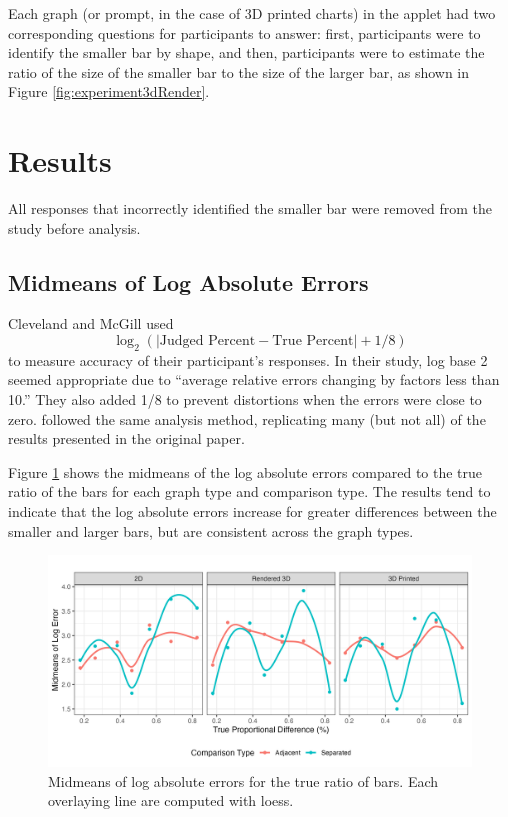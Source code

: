 \documentclass[letterpaper,inpress,dvipsnames]{jdsart}
\begin{document}
Each graph (or prompt, in the case of 3D printed charts) in the applet had two corresponding questions for participants to answer: first, participants were to identify the smaller bar by shape, and then, participants were to estimate the ratio of the size of the smaller bar to the size of the larger bar, as shown in Figure \ref{fig:experiment3dRender}.

\hypertarget{results}{%
\section{Results}\label{results}}

All responses that incorrectly identified the smaller bar were removed from the study before analysis.

\hypertarget{midmeans-of-log-absolute-errors}{%
\subsection{Midmeans of Log Absolute Errors}\label{midmeans-of-log-absolute-errors}}

Cleveland and McGill used
\[\log_2(|\text{Judged Percent} - \text{True Percent}|+1/8)\]
to measure accuracy of their participant's responses.
In their study, log base 2 seemed appropriate due to ``average relative errors changing by factors less than 10.''
They also added 1/8 to prevent distortions when the errors were close to zero.
\citet{heerCrowdsourcingGraphicalPerception2010b} followed the same analysis method, replicating many (but not all) of the results presented in the original paper.

Figure \ref{fig:midmeans-log-errors} shows the midmeans of the log absolute errors compared to the true ratio of the bars for each graph type and comparison type.
The results tend to indicate that the log absolute errors increase for greater differences between the smaller and larger bars, but are consistent across the graph types.

\begin{figure}
\includegraphics[width=0.8\linewidth]{log-error-midmeans} \caption{Midmeans of log absolute errors for the true ratio of bars. Each overlaying line are computed with loess.}\label{fig:midmeans-log-errors}
\end{figure}
\end{document}
